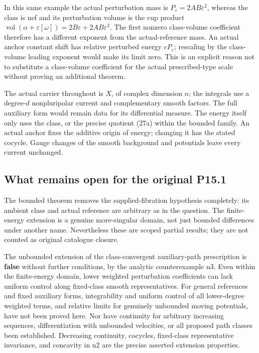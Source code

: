 \documentclass[
  11pt,
]{article}
\begin{document}
In this same example the actual perturbation mass is
\(P_\varepsilon=2AB\varepsilon^2\), whereas the class is nef and its
perturbation volume is the cup product
\(\operatorname{vol}(\alpha+\varepsilon[\omega])=2B\varepsilon+2AB\varepsilon^2\).
The first nonzero class-volume coefficient therefore has a different
exponent from the actual-reference mass. An actual anchor constant shift
has relative perturbed energy \(cP_\varepsilon\); rescaling by the
class-volume leading exponent would make its limit zero. This is an
explicit reason not to substitute a class-volume coefficient for the
actual prescribed-type scale without proving an additional theorem.

The actual carrier throughout is \(X\), of complex dimension \(n\); the
integrals use a degree-\(d\) nonpluripolar current and complementary
smooth factors. The full auxiliary form would remain data for its
differential measure. The energy itself only uses the class, or the
precise quotient (27a) within the bounded family. An actual anchor fixes
the additive origin of energy; changing it has the stated cocycle. Gauge
changes of the smooth background and potentials leave every current
unchanged.

\subsection{What remains open for the original
P15.1}\label{what-remains-open-for-the-original-p15.1}

The bounded theorem removes the supplied-fibration hypothesis
completely: its ambient class and actual reference are arbitrary as in
the question. The finite-energy extension is a genuine more-singular
domain, not just bounded differences under another name. Nevertheless
these are scoped partial results; they are not counted as original
catalogue closure.

The unbounded extension of the class-convergent auxiliary-path
prescription is \textbf{false} without further conditions, by the
analytic counterexample n3. Even within the finite-energy domain, lower
weighted perturbation coefficients can lack uniform control along
fixed-class smooth representatives. For general references and fixed
auxiliary forms, integrability and uniform control of all lower-degree
weighted terms, and relative limits for genuinely unbounded moving
potentials, have not been proved here. Nor have continuity for arbitrary
increasing sequences, differentiation with unbounded velocities, or all
proposed path classes been established. Decreasing continuity, cocycles,
fixed-class representative invariance, and concavity in n2 are the
precise asserted extension properties.
\end{document}
